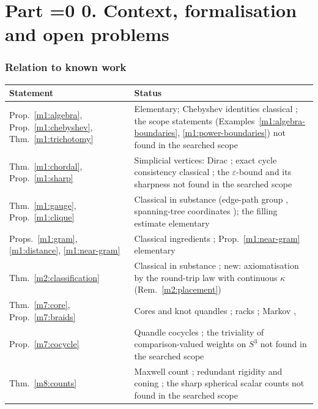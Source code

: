 \documentclass[11pt,reqno]{amsart}
\theoremstyle{definition}
\theoremstyle{remark}
\numberwithin{equation}{section}
\newcounter{ppart}
\renewcommand{\theppart}{\ifnum\value{ppart}=0 0\else\Roman{ppart}\fi}
\newcommand{\paperpart}[2]{\refstepcounter{ppart}\part*{Part \theppart. #2}\label{#1}}
\begin{document}
\setcounter{section}{10}
\renewcommand{\thesection}{\arabic{section}}
\renewcommand{\theHsection}{\arabic{section}}

\paperpart{part:final}{Context, formalisation and open problems}

\section{Relation to known work}\label{sec:known}

\begin{center}
\small
\begin{tabular}{@{}p{}p{}@{}}
\toprule
Statement & Status\\
\midrule
Prop.~\ref{m1:algebra}, Prop.~\ref{m1:chebyshev}, Thm.~\ref{m1:trichotomy} & Elementary; Chebyshev identities classical \cite{m1:DLMF}; the scope statements (Examples~\ref{m1:algebra-boundaries}, \ref{m1:power-boundaries}) not found in the searched scope\\
Thm.~\ref{m1:chordal}, Prop.~\ref{m1:sharp} & Simplicial vertices: Dirac \cite{m1:Dirac}; exact cycle consistency classical \cite{m1:Zaslavsky,m1:LermanShi,m1:Singer}; the $\varepsilon$-bound and its sharpness not found in the searched scope\\
Thm.~\ref{m1:gauge}, Prop.~\ref{m1:clique} & Classical in substance (edge-path group \cite{m1:Spanier}, spanning-tree coordinates \cite{Levy10}); the filling estimate elementary\\
Props.~\ref{m1:gram}, \ref{m1:distance}, \ref{m1:near-gram} & Classical ingredients \cite{m1:Schoenberg,m1:JordanVonNeumann,m1:Grone}; Prop.~\ref{m1:near-gram} elementary\\
Thm.~\ref{m2:classification} & Classical in substance \cite{Loos,Helgason,Wang52,Cartan26,Besse78}; new: axiomatisation by the round-trip law with continuous $\kappa$ (Rem.~\ref{m2:placement})\\
Thm.~\ref{m7:core}, Prop.~\ref{m7:braids} & Cores and knot quandles \cite{m7:Joyce,m7:Matveev}; racks \cite{m7:FennRourke}; Markov \cite{m7:Markov}, \cite[Thm.~2.3]{m7:Birman}\\
Prop.~\ref{m7:cocycle} & Quandle cocycles \cite{m7:CJKLS}; the triviality of comparison-valued weights on $S^3$ not found in the searched scope\\
Thm.~\ref{m8:counts} & Maxwell count \cite{m8:maxwell}; redundant rigidity and coning \cite{m8:hendrickson,m8:coning}; the sharp spherical scalar counts not found in the searched scope\\

\end{tabular}
\end{center}
\end{document}
